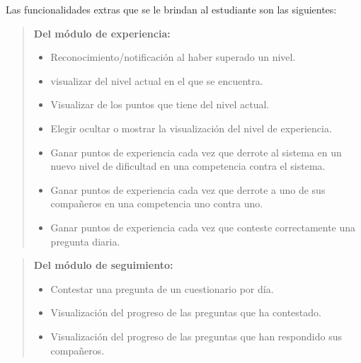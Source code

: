     \noindent
    Las funcionalidades extras que se le brindan al estudiante son las siguientes:

    \begin{quote}
    {\bf Del módulo de experiencia:}
        \begin{itemize}
        \item Reconocimiento/notificación al haber superado un nivel.
        \item visualizar del nivel actual en el que se encuentra.
        \item Visualizar de los puntos que tiene del nivel actual.
        \item Elegir ocultar o mostrar la visualización del nivel de experiencia.

        \item Ganar puntos de experiencia cada vez que derrote al sistema en un
              nuevo nivel de dificultad en una competencia contra el sistema.

        \item Ganar puntos de experiencia cada vez que derrote a uno
              de sus compañeros en una competencia uno contra uno.

        \item Ganar puntos de experiencia cada vez que conteste correctamente
              una pregunta diaria.
        \end{itemize}
    \end{quote}

    \begin{quote}
    {\bf Del módulo de seguimiento:}
        \begin{itemize}
        \item Contestar una pregunta de un cuestionario por día.
        \item Visualización del progreso de las preguntas que ha contestado.
        \item Visualización del progreso de las preguntas que han respondido sus compañeros.
        \end{itemize}
    \end{quote}

